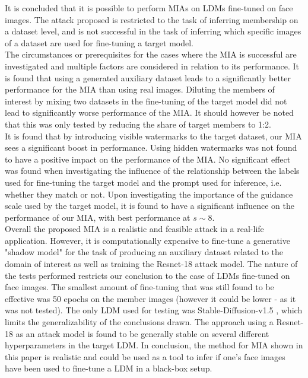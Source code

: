 It is concluded that it is possible to perform \acrlong{MIA}s on \acrlong{LDM}s fine-tuned on face images. The attack proposed is restricted to the task of inferring membership on a dataset level, and is not successful in the task of inferring which specific images of a dataset are used for fine-tuning a target model.\\
The circumstances or prerequisites for the cases where the MIA is successful are investigated and multiple factors are considered in relation to its performance. It is found that using a generated auxiliary dataset leads to a significantly better performance for the MIA than using real images. Diluting the members of interest by mixing two datasets in the fine-tuning of the target model did not lead to significantly worse performance of the MIA. It should however be noted that this was only tested by reducing the share of target members to 1:2. \\
It is found that by introducing visible watermarks to the target dataset, our MIA sees a significant boost in performance. Using hidden watermarks was not found to have a positive impact on the performance of the MIA. No significant effect was found when investigating the influence of the relationship between the labels used for fine-tuning the target model and the prompt used for inference, i.e. whether they match or not. Upon investigating the importance of the guidance scale used by the target model, it is found to have a significant influence on the performance of our MIA, with best performance at $s\sim8$.\\ 
Overall the proposed MIA is a realistic and feasible attack in a real-life application. However, it is computationally expensive to fine-tune a generative "shadow model" for the task of producing an auxiliary dataset related to the domain of interest as well as training the Resnet-18 attack model. The nature of the tests performed restricts our conclusion to the case of LDMs fine-tuned on face images. The smallest amount of fine-tuning that was still found to be effective was 50 epochs on the member images (however it could be lower - as it was not tested). The only LDM used for testing was Stable-Diffusion-v1.5 \cite{rombach2022highresolution}, which limits the generalizability of the conclusions drawn. The approach using a Resnet-18 as an attack model is found to be generally stable on several different hyperparameters in the target LDM. In conclusion, the method for \acrlong{MIA} shown in this paper is realistic and could be used as a tool to infer if one's face images have been used to fine-tune a \acrlong{LDM} in a black-box setup.
